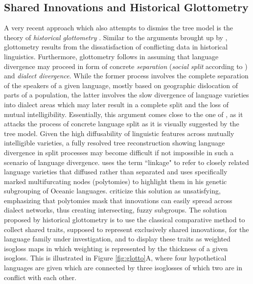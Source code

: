 \documentclass[svgnames,12pt]{scrartcl}
\begin{document}
{{\subsection{Shared Innovations and Historical Glottometry} 
A very recent approach which also attempts to dismiss the tree model is the theory of
\emph{historical glottometry} \citep{Francois2014,Kalyan2016}. Similar to the arguments brought up
by \citet{Schmidt1872}, glottometry results from the dissatisfaction of conflicting data in
historical linguistics.  Furthermore, glottometry follows \citet{Ross1988} in assuming that language
divergence may proceed in form of concrete \emph{separation} (\emph{social split} according to
\citealt{Francois2014}) and \emph{dialect divergence}. While the former process involves the
complete separation of the speakers of a given language, mostly based on geographic dislocation of
parts of a population, the latter involves the slow divergence of language varieties into dialect
areas which may later result in a complete split and the loss of mutual intelligibility.
Essentially, this argument comes close to the one of \citet{Schuchardt1870}, as it attacks the
process of concrete language split as it is visually suggested by the tree model. Given the high
diffusability of linguistic features across mutually intelligible varieties, a fully resolved tree
reconstruction showing language divergence in split processes may become difficult if not impossible
in such a scenario of language divergence. \citet{Ross1988} uses the term ``linkage" to refer to
closely related language varieties that diffused rather than separated and uses specifically marked
multifurcating nodes (polytomies) to highlight them in his genetic subgrouping of Oceanic languages.
\citet{Kalyan2016} criticize this solution as unsatisfying, emphasizing that polytomies mask that innovations can easily
spread across dialect networks, thus creating intersecting, fuzzy subgroups. 
The solution proposed
by historical glottometry is to use the classical comparative method to collect shared
traits, supposed to represent exclusively shared innovations,
for the language family under investigation, and to display these traits as weighted isogloss
maps in which weighting is represented by the thickness of a given isogloss. This is illustrated in
Figure \ref{fig:glotto}A, where four hypothetical languages are given which are connected by three
isoglosses of which two are in conflict with each other.

}}
\end{document}
